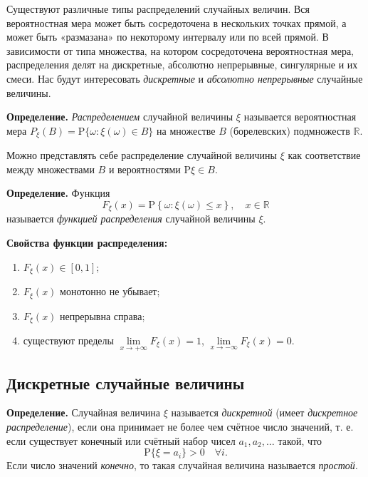 \documentclass[11pt,a4paper]{article}
\providecommand{\tightlist}{%
      \setlength{\itemsep}{0pt}\setlength{\parskip}{0pt}}
\begin{document}
Существуют различные типы распределений случайных величин. Вся
вероятностная мера может быть сосредоточена в нескольких точках прямой,
а может быть «размазана» по некоторому интервалу или по всей прямой. В
зависимости от типа множества, на котором сосредоточена вероятностная
мера, распределения делят на дискретные, абсолютно непрерывные,
сингулярные и их смеси. Нас будут интересовать \emph{дискретные} и
\emph{абсолютно непрерывные} случайные величины.

\textbf{Определение.} \emph{Распределением} случайной величины \(\xi\)
называется вероятностная мера
\(P_\xi(B) = \mathrm{P}\{\omega: \xi(\omega) \in B\}\) на множестве
\(B\) (борелевских) подмножеств \(\mathbb{R}\).

Можно представлять себе распределение случайной величины \(\xi\) как
соответствие между множествами \(B\) и вероятностями
\(\mathrm{P}{\xi \in B}\).

\textbf{Определение.} Функция \[
  F_\xi(x) = \mathrm{P}\left\{ \omega: \xi(\omega) \le x \right\}, \quad x \in \mathbb{R}
\] называется \emph{функцией распределения} случайной величины \(\xi\).

    \textbf{Свойства функции распределения:}

\begin{enumerate}
\def\labelenumi{\arabic{enumi}.}
\tightlist
\item
  \(F_\xi(x) \in [0,1]\);
\item
  \(F_\xi(x)\) монотонно не убывает;
\item
  \(F_\xi(x)\) непрерывна справа;
\item
  существуют пределы \(\lim\limits_{x\rightarrow +\infty}F_\xi(x)=1\),
  \(\lim\limits_{x\rightarrow -\infty}F_\xi(x)=0\).
\end{enumerate}

    \hypertarget{ux434ux438ux441ux43aux440ux435ux442ux43dux44bux435-ux441ux43bux443ux447ux430ux439ux43dux44bux435-ux432ux435ux43bux438ux447ux438ux43dux44b}{%
\subsection{Дискретные случайные
величины}\label{ux434ux438ux441ux43aux440ux435ux442ux43dux44bux435-ux441ux43bux443ux447ux430ux439ux43dux44bux435-ux432ux435ux43bux438ux447ux438ux43dux44b}}

\textbf{Определение.} Случайная величина \(\xi\) называется
\emph{дискретной} (имеет \emph{дискретное распределение}), если она
принимает не более чем счётное число значений, т. е. если существует
конечный или счётный набор чисел \(a_1, a_2, \ldots\) такой, что \[
  \mathrm{P}\{\xi=a_i\} > 0 \quad \forall i.
\] Если число значений \emph{конечно}, то такая случайная величина
называется \emph{простой}.
\end{document}
